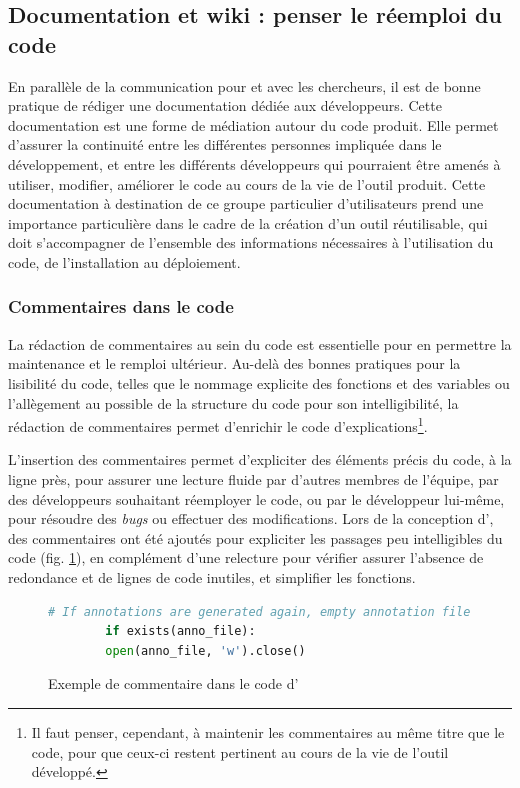 \subsection{Documentation et wiki : penser le réemploi du code}
En parallèle de la communication pour et avec les chercheurs, il est de bonne pratique de rédiger une documentation dédiée aux développeurs. Cette documentation est une forme de médiation autour du code produit. Elle permet d'assurer la continuité entre les différentes personnes impliquée dans le développement, et entre les différents développeurs qui pourraient être amenés à utiliser, modifier, améliorer le code au cours de la vie de l'outil produit. Cette documentation à destination de ce groupe particulier d'utilisateurs prend une importance particulière dans le cadre de la création d'un outil réutilisable, qui doit s'accompagner de l'ensemble des informations nécessaires à l'utilisation du code, de l'installation au déploiement.
	
    \subsubsection{Commentaires dans le code}
    La rédaction de commentaires au sein du code est essentielle pour en permettre la maintenance et le remploi ultérieur. Au-delà des bonnes pratiques pour la lisibilité du code, telles que le nommage explicite des fonctions et des variables ou l'allègement au possible de la structure du code pour son intelligibilité, la rédaction de commentaires permet d'enrichir le code d'explications\footnote{Il faut penser, cependant, à maintenir les commentaires au même titre que le code, pour que ceux-ci restent pertinent au cours de la vie de l'outil développé.}. 
    
    L'insertion des commentaires permet d'expliciter des éléments précis du code, à la ligne près, pour assurer une lecture fluide par d'autres membres de l'équipe, par des développeurs souhaitant réemployer le code, ou par le développeur lui-même, pour résoudre des \textit{bugs} ou effectuer des modifications. Lors de la conception d'\exapi, des commentaires ont été ajoutés pour expliciter les passages peu intelligibles du code (fig. \ref{fig:commentaire_exapi}), en complément d'une relecture pour vérifier assurer l'absence de redondance et de lignes de code inutiles, et simplifier les fonctions. 
    
    \begin{figure}[h]
   		\begin{lstlisting}[language=Python]
   		# If annotations are generated again, empty annotation file
   		if exists(anno_file):
   		open(anno_file, 'w').close()\end{lstlisting}
   		\caption{Exemple de commentaire dans le code d'\exapi}
   		\label{fig:commentaire_exapi}
    \end{figure}
	
